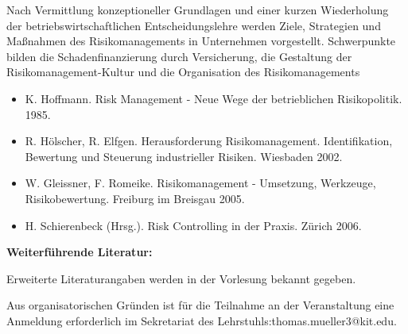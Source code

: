 \begin{course}
\begin{content}
 

Nach Vermittlung konzeptioneller Grundlagen und einer kurzen Wiederholung der betriebswirtschaftlichen Entscheidungslehre werden Ziele, Strategien und Maßnahmen des Risikomanagements in Unternehmen vorgestellt. Schwerpunkte bilden die Schadenfinanzierung durch Versicherung, die Gestaltung der Risikomanagement-Kultur und die Organisation des Risikomanagements


\end{content}



\begin{literature}\begin{itemize}\item K. Hoffmann. Risk Management - Neue Wege der betrieblichen Risikopolitik. 1985.  \item R. Hölscher, R. Elfgen. Herausforderung Risikomanagement. Identifikation, Bewertung und Steuerung industrieller Risiken. Wiesbaden 2002.  \item W. Gleissner, F. Romeike. Risikomanagement - Umsetzung, Werkzeuge, Risikobewertung. Freiburg im Breisgau 2005.  \item H. Schierenbeck (Hrsg.). Risk Controlling in der Praxis. Zürich 2006.  \end{itemize}

\textbf{Weiterführende Literatur:}

 

Erweiterte Literaturangaben werden in der Vorlesung bekannt gegeben.

\end{literature}

\begin{remarks}Aus organisatorischen Gründen ist für die Teilnahme an der Veranstaltung eine Anmeldung erforderlich im Sekretariat des Lehrstuhls:thomas.mueller3@kit.edu.

\end{remarks}

\end{course}